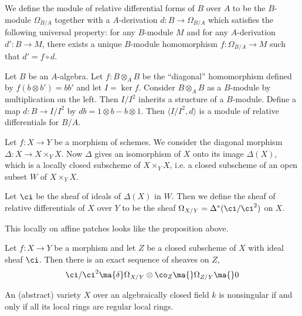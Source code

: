 \begin{dfn}
We define the module of relative differential forms of $B$ over $A$ to be the $B$-module $\Omega_{B/A}$ together with a $A$-derivation $d: B \to \Omega_{B/A}$ which satisfies the following universal property: for any $B$-module $M$ and for any $A$-derivation $d': B \to M$, there exists a unique $B$-module homomorphism $f: \Omega_{B/A} \to M$ such that $d'= f \circ d$.
\end{dfn}

\begin{prop}
Let $B$ be an $A$-algebra. Let $f: B \otimes_A B$ be the ``diagonal'' homomorphism defined by $f(b \otimes b')=bb'$ and let $I=\ker f$. Consider $B \otimes_A B$ as a $B$-module by multiplication on the left. Then $I/I^2$ inherits a structure of a $B$-module. Define a map $d: B \to I/I^2$ by $db= 1 \otimes b - b\otimes 1$. Then $\langle I/I^2,d\rangle$ is a module of relative differentials for $B/A$.
\end{prop}

Let $f: X \to Y$ be a morphism of schemes. We consider the diagonal morphism $\Delta: X \to X \times_Y X$. Now $\Delta$ gives an isomorphism of $X$ onto its image $\Delta(X)$, which is a locally closed subscheme of $X \times_Y X$, i.e. a closed subscheme of an open subset $W$ of $X \times_Y X$.

\begin{dfn}
Let $\ci$ be the sheaf of ideals of $\Delta(X)$ in $W$. Then we define the sheaf of relative differentials of $X$ over $Y$ to be the sheaf $\Omega_{X/Y}=\Delta^*(\ci/\ci^2)$ on $X$.
\end{dfn}


\begin{rem}
This locally on affine patches looks like the proposition above.
\end{rem}

\begin{prop}
Let $f: X \to Y$ be a morphism and let $Z$ be a closed subscheme of $X$ with ideal sheaf $\ci$. Then there is an exact sequence of sheaves on $Z$,
	\[
	\ci/\ci^2 \ma{\delta} \Omega_{X/Y} \otimes \co_Z \ma{} \Omega_{Z/Y} \ma{} 0
	\]
\end{prop}


\begin{dfn}
An (abstract) variety $X$ over an algebraically closed field $k$ is nonsingular if and only if all its local rings are regular local rings.
\end{dfn}

